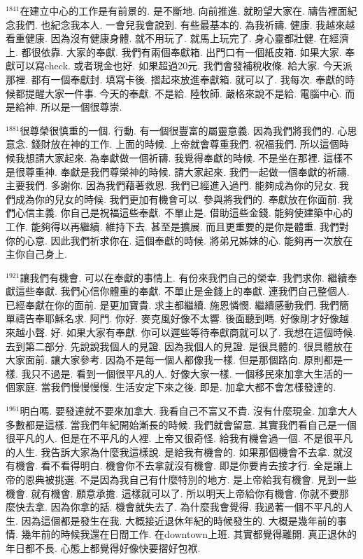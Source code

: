 \documentclass{book}
\begin{document}
$^{1841}$在建立中心的工作是有前景的.
是不斷地.
向前推進.
就盼望大家在.
禱告裡面紀念我們.
也紀念我本人.
一會兒我會說到.
有些最基本的.
為我祈禱.
健康.
我越來越看重健康.
因為沒有健康身體.
就不用玩了.
就馬上玩完了.
身心靈都壯健.
在經濟上.
都很依靠.
大家的奉獻.
我們有兩個奉獻箱.
出門口有一個紙皮箱.
如果大家.
奉獻可以寫check.
或者現金也好.
如果超過20元.
我們會發補稅收條.
給大家.
今天派那裡.
都有一個奉獻封.
填寫卡後.
摺起來放進奉獻箱.
就可以了.
我每次.
奉獻的時候都提醒大家一件事.
今天的奉獻.
不是給.
陸牧師.
嚴格來說不是給.
電腦中心.
而是給神.
所以是一個很尊崇.

$^{1881}$很尊榮很慎重的一個.
行動.
有一個很豐富的屬靈意義.
因為我們將我們的.
心思意念.
錢財放在神的工作.
上面的時候.
上帝就會尊重我們.
祝福我們.
所以這個時候我想請大家起來.
為奉獻做一個祈禱.
我覺得奉獻的時候.
不是坐在那裡.
這樣不是很尊重神.
奉獻是我們尊榮神的時候.
請大家起來.
我們一起做一個奉獻的祈禱.
主要我們.
多謝你.
因為我們藉著救恩.
我們已經進入過門.
能夠成為你的兒女.
我們成為你的兒女的時候.
我們更加有機會可以.
參與將我們的.
奉獻放在你面前.
我們心信主義.
你自己是祝福這些奉獻.
不單止是.
借助這些金錢.
能夠使建築中心的工作.
能夠得以再繼續.
維持下去.
甚至是擴展.
而且更重要的是你是體重.
我們對你的心意.
因此我們祈求你在.
這個奉獻的時候.
將弟兄姊妹的心.
能夠再一次放在主你自己身上.

$^{1921}$讓我們有機會.
可以在奉獻的事情上.
有份來我們自己的榮幸.
我們求你.
繼續奉獻這些奉獻.
我們心信你體重的奉獻.
不單止是金錢上的奉獻.
連我們自己整個人.
已經奉獻在你的面前.
是更加寶貴.
求主都繼續.
施恩憐憫.
繼續感動我們.
我們簡單禱告奉耶穌名求.
阿門.
你好.
麥克風好像不太響.
後面聽到嗎.
好像剛才好像越來越小聲.
好.
如果大家有奉獻.
你可以遲些等待奉獻商就可以了.
我想在這個時候.
去到第二部分.
先說說我個人的見證.
因為我個人的見證.
是很具體的.
很具體放在大家面前.
讓大家參考.
因為不是每一個人都像我一樣.
但是那個路向.
原則都是一樣.
我只不過是.
看到一個很平凡的人.
好像大家一樣.
一個移民來加拿大生活的一個家庭.
當我們慢慢慢慢.
生活安定下來之後.
即是.
加拿大都不會怎樣發達的.

$^{1961}$明白嗎.
要發達就不要來加拿大.
我看自己不富又不貴.
沒有什麼現金.
加拿大人多數都是這樣.
當我們年紀開始漸長的時候.
我們就會留意.
其實我們看自己是一個很平凡的人.
但是在不平凡的人裡.
上帝又很奇怪.
給我有機會過一個.
不是很平凡的人生.
我告訴大家為什麼我這樣說.
是給我有機會的.
如果那個機會不去拿.
就沒有機會.
看不看得明白.
機會你不去拿就沒有機會.
即是你要肯去接才行.
全是讓上帝的恩典被挑選.
不是因為我自己有什麼特別的地方.
是上帝給我有機會.
見到一些機會.
就有機會.
願意承擔.
這樣就可以了.
所以明天上帝給你有機會.
你就不要那麼快去拿.
因為你拿的話.
機會就失去了.
為什麼我會覺得.
我過著一個不平凡的人生.
因為這個都是發生在我.
大概接近退休年紀的時候發生的.
大概是幾年前的事情.
幾年前的時候我還在日間工作.
在downtown上班.
其實都覺得離開.
真正退休的年日都不長.
心態上都覺得好像快要摺好包袱.
\end{document}
